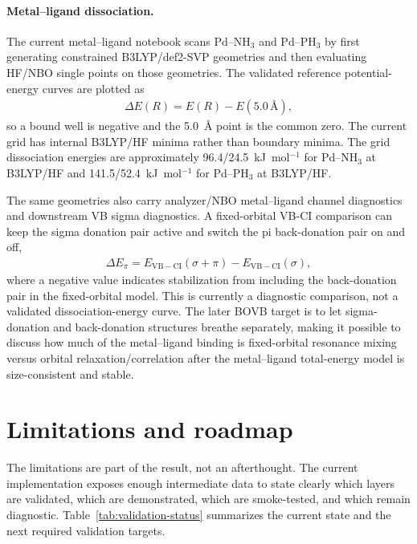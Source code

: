 \documentclass[11pt]{article}
\begin{document}
\paragraph{Metal--ligand dissociation.}
The current metal--ligand notebook scans Pd--NH$_3$ and Pd--PH$_3$ by first generating constrained B3LYP/def2-SVP geometries and then evaluating HF/NBO single points on those geometries.  The validated reference potential-energy curves are plotted as
\begin{equation}
\begin{aligned}
	\Delta E(R)=E(R)-E(5.0\,\text{\AA}),
\end{aligned}
\end{equation}
so a bound well is negative and the 5.0~\AA{} point is the common zero.  The current grid has internal B3LYP/HF minima rather than boundary minima.  The grid dissociation energies are approximately 96.4/24.5~kJ~mol$^{-1}$ for Pd--NH$_3$ at B3LYP/HF and 141.5/52.4~kJ~mol$^{-1}$ for Pd--PH$_3$ at B3LYP/HF.

The same geometries also carry analyzer/NBO metal--ligand channel diagnostics and downstream VB sigma diagnostics.  A fixed-orbital VB-CI comparison can keep the sigma donation pair active and switch the pi back-donation pair on and off,
\begin{equation}
\begin{aligned}
	\Delta E_{\pi}
	= E_{\mathrm{VB-CI}}(\sigma+\pi)
	- E_{\mathrm{VB-CI}}(\sigma),
\end{aligned}
\end{equation}
where a negative value indicates stabilization from including the back-donation pair in the fixed-orbital model.  This is currently a diagnostic comparison, not a validated dissociation-energy curve.  The later BOVB target is to let sigma-donation and back-donation structures breathe separately, making it possible to discuss how much of the metal--ligand binding is fixed-orbital resonance mixing versus orbital relaxation/correlation after the metal--ligand total-energy model is size-consistent and stable.

\section{Limitations and roadmap}

The limitations are part of the result, not an afterthought.  The current implementation exposes enough intermediate data to state clearly which layers are validated, which are demonstrated, which are smoke-tested, and which remain diagnostic.  Table~\ref{tab:validation-status} summarizes the current state and the next required validation targets.
\end{document}
